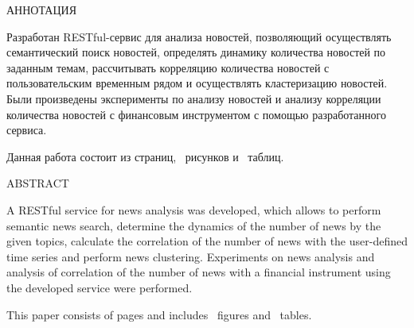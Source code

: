 \begin{center}
	АННОТАЦИЯ
\end{center}

Разработан RESTful-сервис для анализа новостей, позволяющий осуществлять семантический поиск новостей, определять динамику количества новостей по заданным темам, рассчитывать корреляцию количества новостей с пользовательским временным рядом и осуществлять кластеризацию новостей. Были произведены эксперименты по анализу новостей и анализу корреляции количества новостей с финансовым инструментом с помощью разработанного сервиса.

Данная работа состоит из \pageref{LastPage} страниц, \totalfigures ~рисунков и \totaltables ~таблиц.

\begin{center}
	ABSTRACT
\end{center}

A RESTful service for news analysis was developed, which allows to perform semantic news search, determine the dynamics of the number of news by the given topics, calculate the correlation of the number of news with the user-defined time series and perform news clustering. Experiments on news analysis and analysis of correlation of the number of news with a financial instrument using the developed service were performed.

This paper consists of \pageref{LastPage} pages and includes \totalfigures ~figures and \totaltables ~tables.
